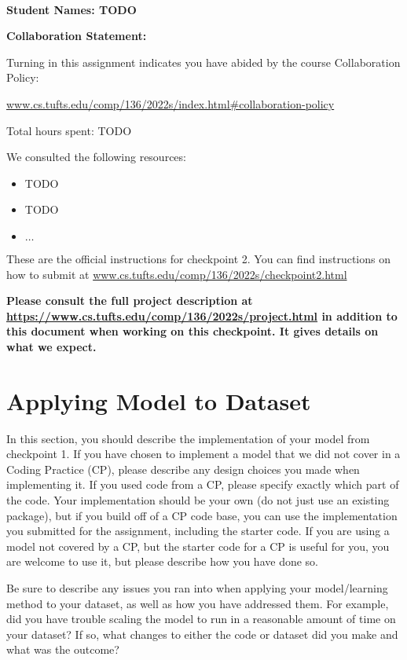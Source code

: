 \documentclass[12pt]{article}
\begin{document}
~~\\ %

{\Large{\bf Student Names: TODO}}


{\Large{\bf Collaboration Statement:}}

Turning in this assignment indicates you have abided by the course Collaboration Policy:

\url{www.cs.tufts.edu/comp/136/2022s/index.html#collaboration-policy}

Total hours spent: TODO

We consulted the following resources:
\begin{itemize}
\item TODO
\item TODO
\item $\ldots$	
\end{itemize}

\newpage

These are the official instructions for checkpoint 2.  You can find instructions on how to submit at \url{www.cs.tufts.edu/comp/136/2022s/checkpoint2.html}

\textbf{Please consult the full project description at \url{https://www.cs.tufts.edu/comp/136/2022s/project.html} in addition to this document when working on this checkpoint.  It gives details on what we expect.}

\section{Applying Model to Dataset}

In this section, you should describe the implementation of your model from checkpoint 1.  If you have chosen to implement a model that we did not cover in a Coding Practice (CP), please describe any design choices you made when implementing it.  If you used code from a CP, please specify exactly which part of the code.  Your implementation should be your own (do not just use an existing package), but if you build off of a CP code base, you can use the implementation you submitted for the assignment, including the starter code.  If you are using a model not covered by a CP, but the starter code for a CP is useful for you, you are welcome to use it, but please describe how you have done so.  

Be sure to describe any issues you ran into when applying your model/learning method to your dataset, as well as how you have addressed them.  For example, did you have trouble scaling the model to run in a reasonable amount of time on your dataset?  If so, what changes to either the code or dataset did you make and what was the outcome?
\end{document}
